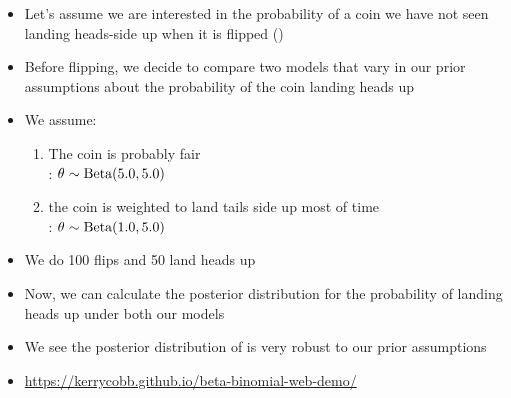 \begin{frame}

    \begin{itemize}
        \item<1-> Let's assume we are interested in the probability of a coin we
            have not seen landing heads-side up when it is flipped
            (\probheads)

        \item<2-> Before flipping, we decide to compare two models that vary in our
            prior assumptions about the probability of the coin landing heads
            up

        \item<3-> We assume:
        \begin{enumerate}
            \item The coin is probably fair \\

                \vspace{1.0ex}
                \coinmodel[1]: $\theta_{} \sim \textrm{Beta}(5.0, 5.0)$

            \vspace{2ex}
            \item the coin is weighted to land tails side up most of time \\

                \vspace{1.0ex}
                \coinmodel[2]: $\theta_{} \sim \textrm{Beta}(1.0, 5.0)$
        \end{enumerate}
    \end{itemize}
\end{frame}


\begin{frame}
    \begin{itemize}
        \item<1-> We do 100 flips and 50 land heads up

        \item<2-> Now, we can calculate the posterior distribution for
            the probability of landing heads up under both our models
    \end{itemize}


    \begin{itemize}
        \item<4-> We see the posterior distribution of \probheads is very
            robust to our prior assumptions

        \item<4-> \href{https://kerrycobb.github.io/beta-binomial-web-demo/}{https://kerrycobb.github.io/beta-binomial-web-demo/}
    \end{itemize}
\end{frame}


